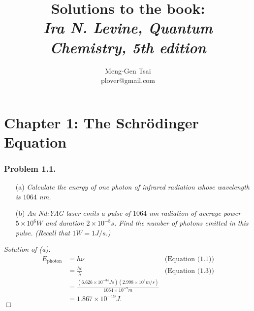 \documentclass{article}
\title{\textbf{Solutions to the book: \\ \emph{Ira N. Levine, Quantum Chemistry, 5th edition}}}
\author{Meng-Gen Tsai \\ plover@gmail.com}
\begin{document}
\maketitle
\tableofcontents












\newpage
\section*{Chapter 1: The Schr\"odinger Equation \\}



\subsubsection*{Problem 1.1.}
\begin{enumerate}
\item[(a)]
\emph{Calculate the energy of one photon of infrared radiation whose wavelength
is $1064$ nm.}
\item[(b)]
\emph{An Nd:YAG laser emits a pulse of $1064$-nm radiation of average power
$5 \times 10^6 W$ and duration $2 \times 10^{-8}s$.
Find the number of photons emitted in this pulse. (Recall that $1W = 1J/s$.)}
\end{enumerate}

\emph{Solution of (a).}
\begin{align*}
E_{\text{photon}}
&= h \nu
  &\text{(Equation (1.1))} \\
&= \frac{hc}{\lambda}
  &\text{(Equation (1.3))} \\
&= \frac{(6.626 \times 10^{-34}Js)(2.998 \times 10^8 m/s)}{1064 \times 10^{-9} m} \\
&= 1.867 \times 10^{-19} J.
\end{align*}
$\Box$ \\
\end{document}
